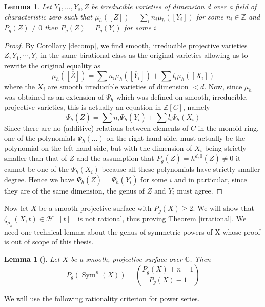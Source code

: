 \documentclass[11pt, a4paper, german]{article}
\theoremstyle{plain}
\newtheorem{lemma}[theorem]{Lemma}
\theoremstyle{definition}
\DeclareMathOperator{\Sym}{Sym}
\begin{document}
\begin{lemma}
    \label{same}
    Let $Y_1,\dots,Y_s,Z$ be irreducible varieties of dimension d over a field of characteristic zero 
    such that $\mu_h([Z]) = \sum_i n_i \mu_h([Y_i])$ for some $n_i \in \mathbb{Z}$ and $P_g(Z) \neq 0$ then $P_g(Z) = P_g(Y_i)$ for some $i$
\end{lemma}
\begin{proof}
    By Corollary \ref{decomp}, we find smooth, irreducible projective varieties $\overline{Z},\overline{Y_1},\cdots, \overline{Y_s}$ in the same
    birational class as the original varieties allowing us to rewrite the original equality as 
    \[
        \mu_h([\overline{Z}]) = \sum n_i\mu_h([\overline{Y}_i]) + \sum l_i \mu_h([X_i])
    \]
    where the $X_i$ are smooth irreducible varieties of dimension $<d$.
    Now, since $\mu_h$ was obtained as an extension of $\Psi_h$ which was defined on smooth, irreducible, projective varieties, this is
    actually an equation in $\mathbb{Z}[C]$, namely
    \[
        \Psi_h(\overline{Z}) = \sum n_i \Psi_h(\overline{Y}_i) + \sum l_i\Psi_h(X_i)
    \]
    Since there are no (additive) relations between elements of $C$ in the monoid ring, one of the polynomials $\Psi_h(\dots)$ on the 
    right hand side, must actually be the polynomial on the left hand side, but with the dimension of 
    $X_i$ being strictly smaller than that of $Z$ and the assumption that
    $P_g(\overline{Z}) = h^{d,0}(\overline{Z}) \neq 0$ it cannot be one of the $\Psi_h(X_i)$ because all these polynomials have strictly smaller
    degree. Hence we have $\Psi_h(\overline{Z}) = \Psi_h(\overline{Y}_i)$ for some $i$ and in particular, since they are of the same dimension, 
    the genus of $\overline{Z}$ and $Y_i$ must agree.
\end{proof}

Now let $X$ be a smooth projective surface with $P_g(X) \geq 2$. We will show that $\zeta_{\mu_h}(X,t) \in \mathcal{H}[[t]]$ is not rational,
thus proving Theorem \ref{irrational}. We need one technical lemma about the genus of symmetric powers of X whose proof is out of scope of this
thesis.

\begin{lemma}[{\cite[Lem. 3.8]{MR1996804}}]
    \label{genus}
    Let $X$ be a smooth, projective surface over $\mathbb{C}$. Then
    \[
        P_g(\Sym^n(X)) = \binom{P_g(X) + n - 1}{P_g(X) - 1}
    \]
\end{lemma}

We will use the following rationality criterion for power series.
\end{document}
